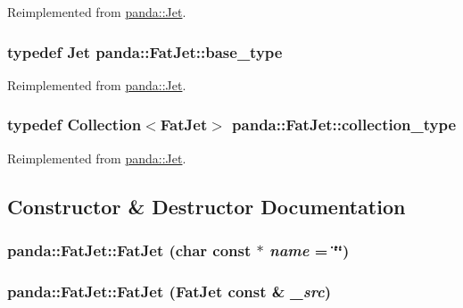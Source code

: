 Reimplemented from \hyperlink{classpanda_1_1Jet_a02ed819ca5ca46b0b3b212dbd56bce57}{panda::Jet}.\hypertarget{classpanda_1_1FatJet_ab06dcce3d9c117c93a036c87fb441795}{
\subsubsection[{base\_\-type}]{\setlength{\rightskip}{0pt plus 5cm}typedef {\bf Jet} {\bf panda::FatJet::base\_\-type}}}
\label{classpanda_1_1FatJet_ab06dcce3d9c117c93a036c87fb441795}


Reimplemented from \hyperlink{classpanda_1_1Jet_a4fbfc283916dbd345b13a61396b878cf}{panda::Jet}.\hypertarget{classpanda_1_1FatJet_a2740a440685d1d581f92bcedbf1a6f9e}{
\subsubsection[{collection\_\-type}]{\setlength{\rightskip}{0pt plus 5cm}typedef {\bf Collection}$<${\bf FatJet}$>$ {\bf panda::FatJet::collection\_\-type}}}
\label{classpanda_1_1FatJet_a2740a440685d1d581f92bcedbf1a6f9e}


Reimplemented from \hyperlink{classpanda_1_1Jet_abc4f1b55581c1f9a65d14ca360458c40}{panda::Jet}.

\subsection{Constructor \& Destructor Documentation}
\hypertarget{classpanda_1_1FatJet_adeb3e4e2777a209439d038a353ec0ba6}{
\subsubsection[{FatJet}]{\setlength{\rightskip}{0pt plus 5cm}panda::FatJet::FatJet (char const $\ast$ {\em name} = {\ttfamily \char`\"{}\char`\"{}})}}
\label{classpanda_1_1FatJet_adeb3e4e2777a209439d038a353ec0ba6}
\hypertarget{classpanda_1_1FatJet_ab92df78ab1a2192c18c8d846966bf6d9}{
\subsubsection[{FatJet}]{\setlength{\rightskip}{0pt plus 5cm}panda::FatJet::FatJet ({\bf FatJet} const \& {\em \_\-src})}}
\label{classpanda_1_1FatJet_ab92df78ab1a2192c18c8d846966bf6d9}


